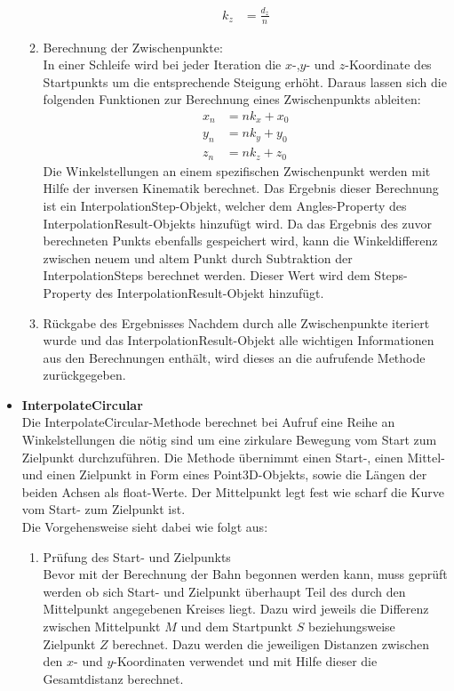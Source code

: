 \begin{itemize}
\begin{enumerate}
\begin{align*}
k_z & = \frac{d_z}{n}
\end{align*}
\item Berechnung der Zwischenpunkte:\\
In einer Schleife wird bei jeder Iteration die $x$-,$y$- und $z$-Koordinate des Startpunkts um die entsprechende Steigung erhöht. Daraus lassen sich die folgenden Funktionen zur Berechnung eines Zwischenpunkts ableiten:
\begin{align*}
x_n & = n k_x + x_0\\
y_n & =  n k_y + y_0\\
z_n & = n k_z + z_0 
\end{align*}
Die Winkelstellungen an einem spezifischen Zwischenpunkt werden mit Hilfe der inversen Kinematik berechnet. Das Ergebnis dieser Berechnung ist ein InterpolationStep-Objekt, welcher dem Angles-Property des InterpolationResult-Objekts hinzufügt wird. Da das Ergebnis des zuvor berechneten Punkts ebenfalls gespeichert wird, kann die Winkeldifferenz zwischen neuem und altem Punkt durch Subtraktion der InterpolationSteps berechnet werden. Dieser Wert wird dem Steps-Property des InterpolationResult-Objekt hinzufügt.
\item Rückgabe des Ergebnisses
Nachdem durch alle Zwischenpunkte iteriert wurde und das InterpolationResult-Objekt alle wichtigen Informationen aus den Berechnungen enthält, wird dieses an die aufrufende Methode zurückgegeben.
\end{enumerate}
\item \textbf{InterpolateCircular}\\
Die InterpolateCircular-Methode berechnet bei Aufruf eine Reihe an Winkelstellungen die nötig sind um eine zirkulare Bewegung vom Start zum Zielpunkt durchzuführen. Die Methode übernimmt einen Start-, einen Mittel- und einen Zielpunkt in Form eines Point3D-Objekts, sowie die Längen der beiden Achsen als float-Werte. Der Mittelpunkt legt fest wie scharf die Kurve vom Start- zum Zielpunkt ist.\\
Die Vorgehensweise sieht dabei wie folgt aus:
\begin{enumerate}
\item Prüfung des Start- und Zielpunkts\\
Bevor mit der Berechnung der Bahn begonnen werden kann, muss geprüft werden ob sich Start- und Zielpunkt überhaupt Teil des durch den Mittelpunkt angegebenen Kreises liegt. Dazu wird jeweils die Differenz zwischen Mittelpunkt $M$ und dem Startpunkt $S$ beziehungsweise Zielpunkt $Z$ berechnet. Dazu werden die jeweiligen Distanzen zwischen den $x$- und $y$-Koordinaten verwendet und mit Hilfe dieser die Gesamtdistanz berechnet.\\

\end{enumerate}
\end{itemize}
